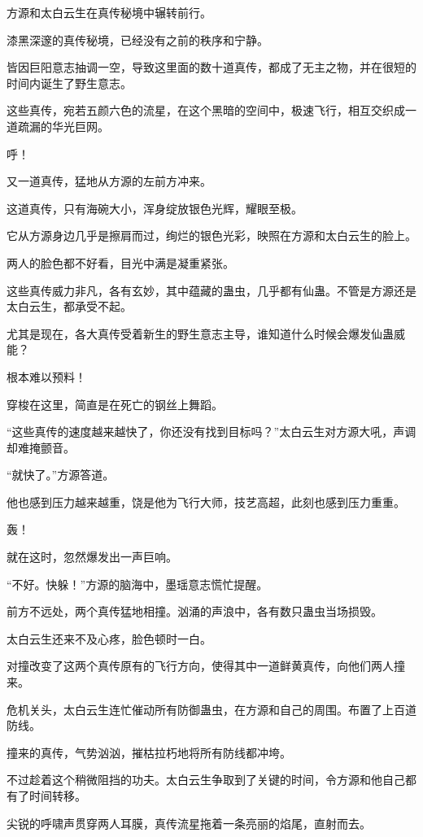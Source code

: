 
\begin{this_body}

方源和太白云生在真传秘境中辗转前行。

漆黑深邃的真传秘境，已经没有之前的秩序和宁静。

皆因巨阳意志抽调一空，导致这里面的数十道真传，都成了无主之物，并在很短的时间内诞生了野生意志。

这些真传，宛若五颜六色的流星，在这个黑暗的空间中，极速飞行，相互交织成一道疏漏的华光巨网。

呼！

又一道真传，猛地从方源的左前方冲来。

这道真传，只有海碗大小，浑身绽放银色光辉，耀眼至极。

它从方源身边几乎是擦肩而过，绚烂的银色光彩，映照在方源和太白云生的脸上。

两人的脸色都不好看，目光中满是凝重紧张。

这些真传威力非凡，各有玄妙，其中蕴藏的蛊虫，几乎都有仙蛊。不管是方源还是太白云生，都承受不起。

尤其是现在，各大真传受着新生的野生意志主导，谁知道什么时候会爆发仙蛊威能？

根本难以预料！

穿梭在这里，简直是在死亡的钢丝上舞蹈。

“这些真传的速度越来越快了，你还没有找到目标吗？”太白云生对方源大吼，声调却难掩颤音。

“就快了。”方源答道。

他也感到压力越来越重，饶是他为飞行大师，技艺高超，此刻也感到压力重重。

轰！

就在这时，忽然爆发出一声巨响。

“不好。快躲！”方源的脑海中，墨瑶意志慌忙提醒。

前方不远处，两个真传猛地相撞。汹涌的声浪中，各有数只蛊虫当场损毁。

太白云生还来不及心疼，脸色顿时一白。

对撞改变了这两个真传原有的飞行方向，使得其中一道鲜黄真传，向他们两人撞来。

危机关头，太白云生连忙催动所有防御蛊虫，在方源和自己的周围。布置了上百道防线。

撞来的真传，气势汹汹，摧枯拉朽地将所有防线都冲垮。

不过趁着这个稍微阻挡的功夫。太白云生争取到了关键的时间，令方源和他自己都有了时间转移。

尖锐的呼啸声贯穿两人耳膜，真传流星拖着一条亮丽的焰尾，直射而去。


\end{this_body}
